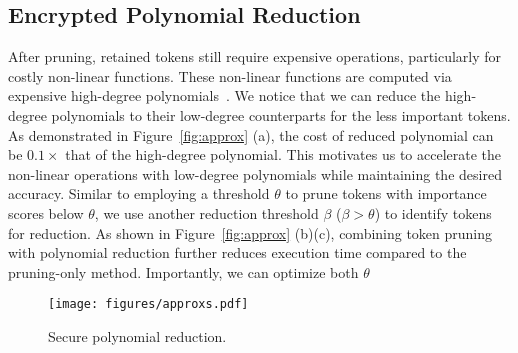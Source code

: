 \subsection{Encrypted Polynomial Reduction}
\label{sec:reduction}


After pruning, retained tokens still require expensive operations, particularly for costly non-linear functions. These non-linear functions are computed via expensive high-degree polynomials~\citep{lu2023bumblebee, pang2023bolt}. We notice that we can reduce the high-degree polynomials to their low-degree counterparts for the less important tokens. As demonstrated in Figure~\ref{fig:approx} (a), the cost of reduced polynomial can be $0.1\times$ that of the high-degree polynomial. This motivates us to accelerate the non-linear operations with low-degree polynomials while maintaining the desired accuracy. Similar to employing a threshold $\theta$ to prune tokens with importance scores below $\theta$, we use another reduction threshold $\beta$ ($\beta > \theta$) to identify tokens for reduction. As shown in Figure~\ref{fig:approx} (b)(c), combining token pruning with polynomial reduction further reduces execution time compared to the pruning-only method. Importantly, we can optimize both $\theta$
\begin{wrapfigure}{r}{0.4\textwidth}  %
  \centering
  \vspace{-0.1in}
  \texttt{[image: figures/approxs.pdf]}
  \caption{Secure polynomial reduction.}
  \vspace{-0.1in}
  \label{f:approx-protocol}
\end{wrapfigure}
